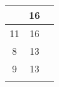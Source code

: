 \begin{table}[H]
\begin{tabularx}{\textwidth}{p{.1em}cc}
\begin{tabular}[t]{cc}
\multicolumn{1}{|c|}{5}                                                        & \multicolumn{1}{c|}{16}                                                             \\ \hline
\multicolumn{1}{|c|}{11}                                                        & \multicolumn{1}{c|}{16}                                                             \\ \hline
\multicolumn{1}{|c|}{8}                                                        & \multicolumn{1}{c|}{13}                                                             \\ \hline
\multicolumn{1}{|c|}{9}                                                        & \multicolumn{1}{c|}{13}                                                             \\ \hline
\end{tabular}

\end{tabularx}\end{table}